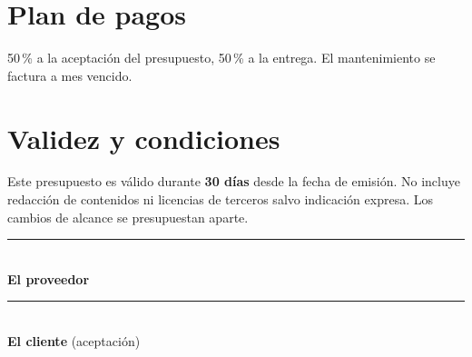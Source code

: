 \documentclass[11pt,a4paper]{article}
\begin{document}
\section{Plan de pagos}
50\,\% a la aceptación del presupuesto, 50\,\% a la entrega. El mantenimiento
se factura a mes vencido.

\section{Validez y condiciones}
Este presupuesto es válido durante \textbf{30 días} desde la fecha de emisión.
No incluye redacción de contenidos ni licencias de terceros salvo indicación
expresa. Los cambios de alcance se presupuestan aparte.

\vspace{2.5em}
\begin{minipage}{0.45\linewidth}
  \rule{\linewidth}{0.4pt}\\ \textbf{El proveedor}
\end{minipage}\hfill
\begin{minipage}{0.45\linewidth}
  \rule{\linewidth}{0.4pt}\\ \textbf{El cliente} (aceptación)
\end{minipage}
\end{document}
